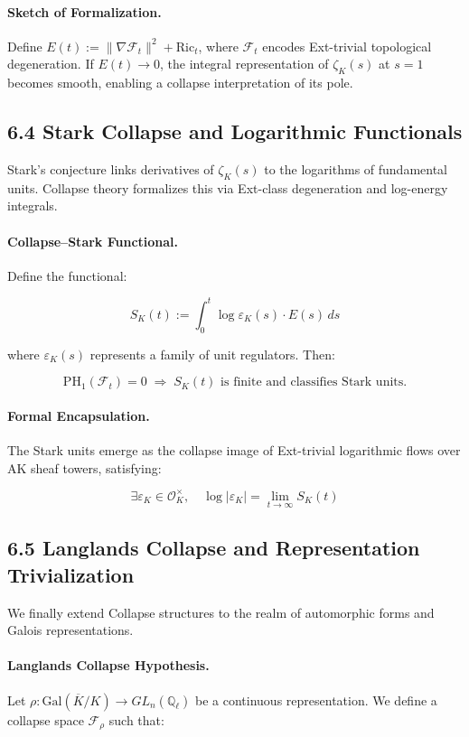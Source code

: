 \documentclass[11pt]{article}
\begin{document}
\paragraph{Sketch of Formalization.}
Define \( E(t) := \|\nabla \mathcal{F}_t\|^2 + \text{Ric}_t \), where \( \mathcal{F}_t \) encodes Ext-trivial topological degeneration.
If \( E(t) \to 0 \), the integral representation of \( \zeta_K(s) \) at \( s = 1 \) becomes smooth, enabling a collapse interpretation of its pole.

\subsection*{6.4 Stark Collapse and Logarithmic Functionals}

Stark's conjecture links derivatives of \( \zeta_K(s) \) to the logarithms of fundamental units.
Collapse theory formalizes this via Ext-class degeneration and log-energy integrals.

\paragraph{Collapse–Stark Functional.}
Define the functional:

\[
S_K(t) := \int_0^t \log \varepsilon_K(s) \cdot E(s)\, ds
\]

where \( \varepsilon_K(s) \) represents a family of unit regulators. Then:

\[
\mathrm{PH}_1(\mathcal{F}_t) = 0 \;\Rightarrow\; S_K(t) \text{ is finite and classifies Stark units.}
\]

\paragraph{Formal Encapsulation.}
The Stark units emerge as the collapse image of Ext-trivial logarithmic flows over AK sheaf towers, satisfying:

\[
\exists \varepsilon_K \in \mathcal{O}_K^\times, \quad \log |\varepsilon_K| = \lim_{t \to \infty} S_K(t)
\]

\subsection*{6.5 Langlands Collapse and Representation Trivialization}

We finally extend Collapse structures to the realm of automorphic forms and Galois representations.

\paragraph{Langlands Collapse Hypothesis.}
Let \( \rho: \text{Gal}(\overline{K}/K) \to GL_n(\mathbb{Q}_\ell) \) be a continuous representation.  
We define a collapse space \( \mathcal{F}_\rho \) such that:
\end{document}

